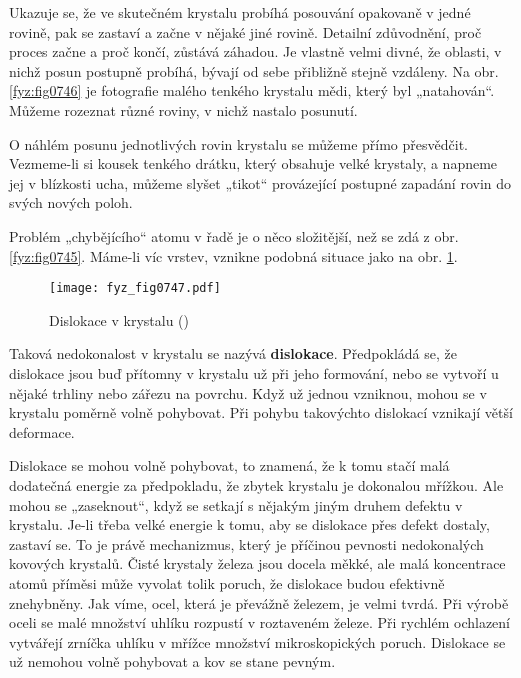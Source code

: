    Ukazuje se, že ve skutečném krystalu probíhá posouvání opakovaně v jedné rovině, pak se zastaví 
    a začne v nějaké jiné rovině. Detailní zdůvodnění, proč proces začne a proč končí, zůstává 
    záhadou. Je vlastně velmi divné, že oblasti, v nichž posun postupně probíhá, bývají od sebe 
    přibližně stejně vzdáleny. Na obr. \ref{fyz:fig0746} je fotografie malého tenkého krystalu mědi, 
    který byl „natahován“. Můžeme rozeznat různé roviny, v nichž nastalo posunutí.
    
    O náhlém posunu jednotlivých rovin krystalu se můžeme přímo přesvědčit. Vezmeme-li si kousek 
    tenkého drátku, který obsahuje velké krystaly, a napneme jej v blízkosti ucha, můžeme slyšet 
    „tikot“ provázející postupné zapadání rovin do svých nových poloh. 
    
    Problém „chybějícího“ atomu v řadě je o něco složitější, než se zdá z obr. \ref{fyz:fig0745}. 
    Máme-li víc vrstev, vznikne podobná situace jako na obr. \ref{fyz:fig0747}. 
    
    \begin{figure}[ht!] %
      \centering
      \texttt{[image: fyz\_fig0747.pdf]}
      \caption{Dislokace v krystalu
               (\cite[s.~554]{Feynman02})}
      \label{fyz:fig0747}
    \end{figure}

    Taková nedokonalost v krystalu se nazývá \textbf{dislokace}. Předpokládá se, že dislokace jsou 
    buď přítomny v krystalu už při jeho formování, nebo se vytvoří u nějaké trhliny nebo zářezu na 
    povrchu. Když už jednou vzniknou, mohou se v krystalu poměrně volně pohybovat. Při pohybu 
    takovýchto dislokací vznikají větší deformace.
    
    Dislokace se mohou volně pohybovat, to znamená, že k tomu stačí malá dodatečná energie za 
    předpokladu, že zbytek krystalu je dokonalou mřížkou. Ale mohou se „zaseknout“, když se setkají 
    s nějakým jiným druhem defektu v krystalu. Je-li třeba velké energie k tomu, aby se dislokace 
    přes defekt dostaly, zastaví se. To je právě mechanizmus, který je příčinou pevnosti 
    nedokonalých kovových krystalů. Čisté krystaly železa jsou docela měkké, ale malá koncentrace 
    atomů příměsi může vyvolat tolik poruch, že dislokace budou efektivně znehybněny. Jak víme, 
    ocel, která je převážně železem, je velmi tvrdá. Při výrobě oceli se malé množství uhlíku 
    rozpustí v roztaveném železe. Při rychlém ochlazení vytvářejí zrníčka uhlíku v mřížce množství 
    mikroskopických poruch. Dislokace se už nemohou volně pohybovat a kov se stane pevným.
    
